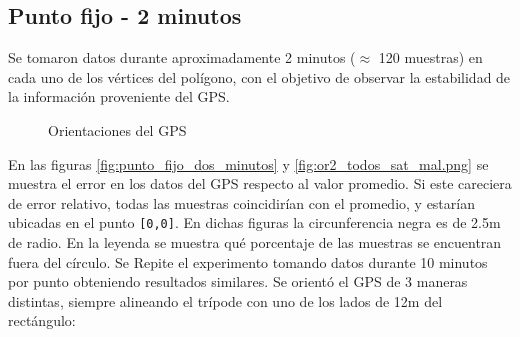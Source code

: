 \documentclass[main]{subfiles}
\begin{document}
\subsection{Punto fijo - 2 minutos}
\label{sec:gps2-punto-fijo-2-minutos}

Se tomaron datos durante aproximadamente 2 minutos ($\approx$ 120 muestras) en cada uno de los vértices del polígono, con el objetivo de observar la estabilidad de la información proveniente del GPS.

\begin{figure}
\vspace{-10pt}
  \centering
\vspace{-10pt}
\caption{Orientaciones del GPS}
\vspace{-20pt}
\end{figure}

En las figuras \ref{fig:punto_fijo_dos_minutos} y \ref{fig:or2_todos_sat_mal.png} se muestra el error en los datos del GPS respecto al valor promedio. Si este careciera de error relativo, todas las muestras coincidirían con el promedio, y estarían ubicadas en el punto \verb+[0,0]+. En dichas figuras la circunferencia negra es de 2.5m de radio. En la leyenda se muestra qué porcentaje de las muestras se encuentran fuera del círculo. Se Repite el experimento tomando datos durante 10 minutos por punto obteniendo resultados similares. Se orientó el GPS de 3 maneras distintas, siempre alineando el trípode con uno de los lados de 12m del rectángulo:
\end{document}
